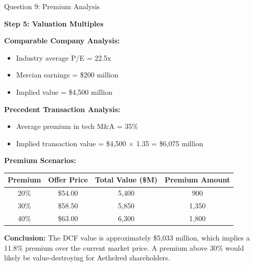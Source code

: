 \documentclass[aspectratio=169]{beamer}
\begin{document}
	\begin{frame}{Question 9: Premium Analysis}
		
		\textbf{Step 5: Valuation Multiples}
		
		\textbf{Comparable Company Analysis:}
		\begin{itemize}
			\item Industry average P/E = 22.5x
			\item Mercian earnings = \$200 million
			\item Implied value = \$4,500 million
		\end{itemize}
		
		\textbf{Precedent Transaction Analysis:}
		\begin{itemize}
			\item Average premium in tech M\&A = 35\%
			\item Implied transaction value = \$4,500 $\times$ 1.35 = \$6,075 million
		\end{itemize}
		
		\textbf{Premium Scenarios:}
		
		\begin{table}[h]
			\centering
			\begin{tabular}{|c|c|c|c|}
				\hline
				\textbf{Premium} & \textbf{Offer Price} & \textbf{Total Value (\$M)} & \textbf{Premium Amount} \\
				\hline
				20\% & \$54.00 & 5,400 & 900 \\
				30\% & \$58.50 & 5,850 & 1,350 \\
				40\% & \$63.00 & 6,300 & 1,800 \\
				\hline
			\end{tabular}
		\end{table}
		
		\textbf{Conclusion:}
		The DCF value is approximately \$5,033 million, which implies a 11.8\% premium over the current market price. A premium above 30\% would likely be value-destroying for Aethelred shareholders.
	\end{frame}
	
\end{document}
